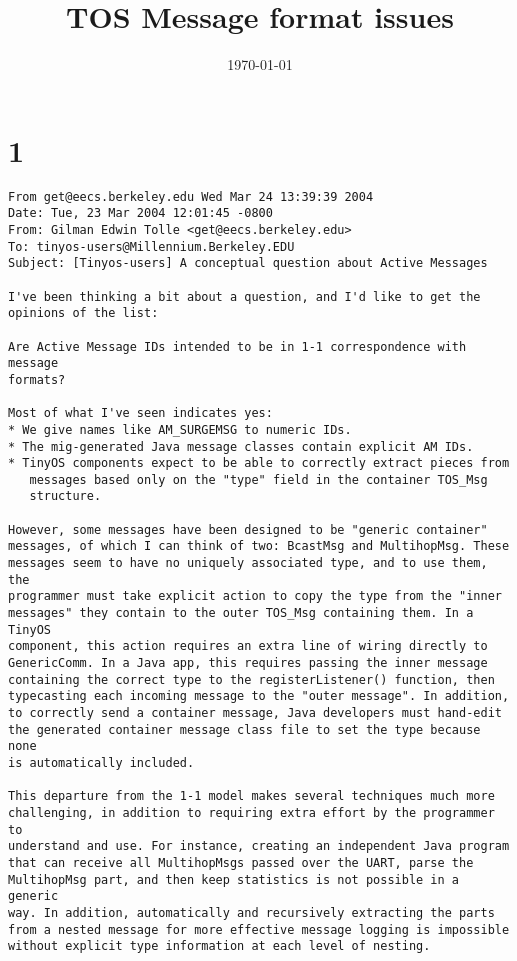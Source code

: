 \documentclass[10pt]{article}
\begin{document}
\title{TOS Message format issues}
\date{\today}
\maketitle


\section*{1}

\begin{verbatim}
From get@eecs.berkeley.edu Wed Mar 24 13:39:39 2004
Date: Tue, 23 Mar 2004 12:01:45 -0800
From: Gilman Edwin Tolle <get@eecs.berkeley.edu>
To: tinyos-users@Millennium.Berkeley.EDU
Subject: [Tinyos-users] A conceptual question about Active Messages

I've been thinking a bit about a question, and I'd like to get the 
opinions of the list:

Are Active Message IDs intended to be in 1-1 correspondence with message 
formats?

Most of what I've seen indicates yes:
* We give names like AM_SURGEMSG to numeric IDs.
* The mig-generated Java message classes contain explicit AM IDs.
* TinyOS components expect to be able to correctly extract pieces from
   messages based only on the "type" field in the container TOS_Msg
   structure.

However, some messages have been designed to be "generic container" 
messages, of which I can think of two: BcastMsg and MultihopMsg. These 
messages seem to have no uniquely associated type, and to use them, the 
programmer must take explicit action to copy the type from the "inner 
messages" they contain to the outer TOS_Msg containing them. In a TinyOS 
component, this action requires an extra line of wiring directly to 
GenericComm. In a Java app, this requires passing the inner message 
containing the correct type to the registerListener() function, then 
typecasting each incoming message to the "outer message". In addition, 
to correctly send a container message, Java developers must hand-edit 
the generated container message class file to set the type because none 
is automatically included.

This departure from the 1-1 model makes several techniques much more 
challenging, in addition to requiring extra effort by the programmer to 
understand and use. For instance, creating an independent Java program 
that can receive all MultihopMsgs passed over the UART, parse the 
MultihopMsg part, and then keep statistics is not possible in a generic 
way. In addition, automatically and recursively extracting the parts 
from a nested message for more effective message logging is impossible 
without explicit type information at each level of nesting.


\end{verbatim}
\end{document}
